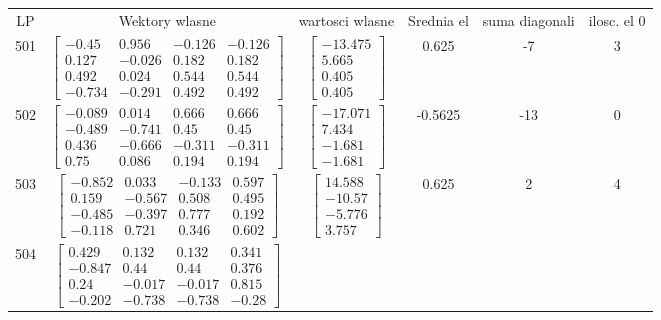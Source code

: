 \documentclass[a4paper,12pt]{article}
\begin{document}
\bgroup {} \vspace{0.2in} \begin{tabular}{c c c c c c}
LP &Wektory wlasne & wartosci wlasne & Srednia el & suma diagonali & ilosc. el 0\\
501
&
$\begin{bmatrix} -0.45 & 0.956 & -0.126 & -0.126 \\ 0.127 & -0.026 & 0.182 & 0.182 \\ 0.492 & 0.024 & 0.544 & 0.544 \\ -0.734 & -0.291 & 0.492 & 0.492 \end{bmatrix}$
&
$\begin{bmatrix} -13.475 \\ 5.665 \\ 0.405 \\ 0.405 \end{bmatrix}$
&
0.625
&
-7
&
3
\\
502
&
$\begin{bmatrix} -0.089 & 0.014 & 0.666 & 0.666 \\ -0.489 & -0.741 & 0.45 & 0.45 \\ 0.436 & -0.666 & -0.311 & -0.311 \\ 0.75 & 0.086 & 0.194 & 0.194 \end{bmatrix}$
&
$\begin{bmatrix} -17.071 \\ 7.434 \\ -1.681 \\ -1.681 \end{bmatrix}$
&
-0.5625
&
-13
&
0
\\
503
&
$\begin{bmatrix} -0.852 & 0.033 & -0.133 & 0.597 \\ 0.159 & -0.567 & 0.508 & 0.495 \\ -0.485 & -0.397 & 0.777 & 0.192 \\ -0.118 & 0.721 & 0.346 & 0.602 \end{bmatrix}$
&
$\begin{bmatrix} 14.588 \\ -10.57 \\ -5.776 \\ 3.757 \end{bmatrix}$
&
0.625
&
2
&
4
\\
504
&
$\begin{bmatrix} 0.429 & 0.132 & 0.132 & 0.341 \\ -0.847 & 0.44 & 0.44 & 0.376 \\ 0.24 & -0.017 & -0.017 & 0.815 \\ -0.202 & -0.738 & -0.738 & -0.28 \end{bmatrix}$

\end{tabular}
\end{document}
